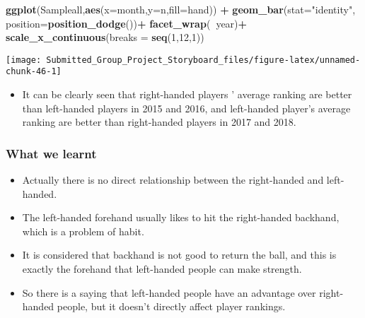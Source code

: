 \documentclass[]{article}
\newenvironment{Shaded}{\begin{snugshade}}{\end{snugshade}}
\newcommand{\KeywordTok}[1]{\textcolor[rgb]{0.13,0.29,0.53}{\textbf{#1}}}
\newcommand{\DataTypeTok}[1]{\textcolor[rgb]{0.13,0.29,0.53}{#1}}
\newcommand{\DecValTok}[1]{\textcolor[rgb]{0.00,0.00,0.81}{#1}}
\newcommand{\StringTok}[1]{\textcolor[rgb]{0.31,0.60,0.02}{#1}}
\newcommand{\OperatorTok}[1]{\textcolor[rgb]{0.81,0.36,0.00}{\textbf{#1}}}
\newcommand{\NormalTok}[1]{#1}
\providecommand{\tightlist}{%
  \setlength{\itemsep}{0pt}\setlength{\parskip}{0pt}}
\begin{document}
\begin{Shaded}
\begin{Highlighting}[]
\KeywordTok{ggplot}\NormalTok{(Sampleall,}\KeywordTok{aes}\NormalTok{(}\DataTypeTok{x=}\NormalTok{month,}\DataTypeTok{y=}\NormalTok{n,}\DataTypeTok{fill=}\NormalTok{hand)) }\OperatorTok{+}
\StringTok{ }\KeywordTok{geom_bar}\NormalTok{(}\DataTypeTok{stat=}\StringTok{"identity"}\NormalTok{, }\DataTypeTok{position=}\KeywordTok{position_dodge}\NormalTok{())}\OperatorTok{+}
\StringTok{  }\KeywordTok{facet_wrap}\NormalTok{(}\OperatorTok{~}\NormalTok{year)}\OperatorTok{+}
\StringTok{  }\KeywordTok{scale_x_continuous}\NormalTok{(}\DataTypeTok{breaks =} \KeywordTok{seq}\NormalTok{(}\DecValTok{1}\NormalTok{,}\DecValTok{12}\NormalTok{,}\DecValTok{1}\NormalTok{))}
\end{Highlighting}
\end{Shaded}

\begin{center}\texttt{[image: Submitted\_Group\_Project\_Storyboard\_files/figure-latex/unnamed-chunk-46-1]} \end{center}

\begin{itemize}
\tightlist
\item
  It can be clearly seen that right-handed players ' average ranking are
  better than left-handed players in 2015 and 2016, and left-handed
  player's average ranking are better than right-handed players in 2017
  and 2018.
\end{itemize}

\subsubsection{What we learnt}\label{what-we-learnt}

\begin{itemize}
\tightlist
\item
  Actually there is no direct relationship between the right-handed and
  left-handed.
\item
  The left-handed forehand usually likes to hit the right-handed
  backhand, which is a problem of habit.
\item
  It is considered that backhand is not good to return the ball, and
  this is exactly the forehand that left-handed people can make
  strength.
\item
  So there is a saying that left-handed people have an advantage over
  right-handed people, but it doesn't directly affect player rankings.
\end{itemize}
\end{document}
